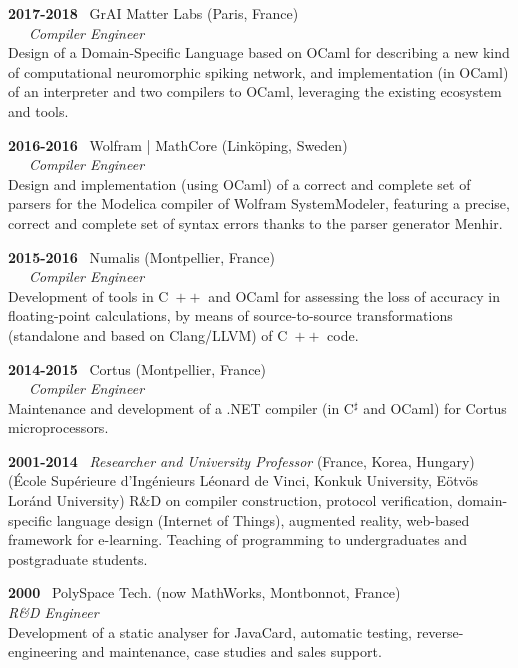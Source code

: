 \documentclass[a4paper,11pt]{article}
\newcommand{\cpp}{\mbox{C \hspace*{-2.5mm} \raise 0.7mm \hbox{${\scriptscriptstyle ++}$}}}
\begin{document}
\bigskip

\noindent\textbf{2017-2018} \ \textsf{GrAI Matter Labs} (Paris,
France)\\ \ \ \ \emph{Compiler Engineer}\\ Design of a Domain-Specific
Language based on OCaml for describing a new kind of computational
neuromorphic spiking network, and implementation (in OCaml) of an
interpreter and two compilers to OCaml, leveraging the existing
ecosystem and tools.

\bigskip

\noindent\textbf{2016-2016} \ \textsf{Wolfram | MathCore}
(Link\"oping, Sweden)\\ \ \ \ \emph{Compiler Engineer}\\ Design and
implementation (using OCaml) of a correct and complete set of parsers
for the Modelica compiler of Wolfram SystemModeler, featuring a
precise, correct and complete set of syntax errors thanks to the
parser generator Menhir.

\newpage

\noindent\textbf{2015-2016} \ \textsf{Numalis} (Montpellier,
France)\\ \ \ \ \emph{Compiler Engineer}\\ Development of tools in
\cpp{} and OCaml for assessing the loss of accuracy in floating-point
calculations, by means of source-to-source transformations (standalone
and based on Clang/LLVM) of \cpp{} code.

\bigskip

\noindent\textbf{2014-2015} \ \textsf{Cortus} (Montpellier,
France)\\ \ \ \ \emph{Compiler Engineer}\\ Maintenance and development
of a .NET compiler (in C$^\sharp$ and OCaml) for \textsf{Cortus}
microprocessors.

\bigskip

\noindent\textbf{2001-2014} \ \textsf{\emph{Researcher and University
    Professor}} (France, Korea, Hungary)\\ (\textsf{\'Ecole
  Sup\'erieure d'Ing\'enieurs L\'eonard de Vinci}, \textsf{Konkuk
  University}, \textsf{E\"otv\"os Lor\'and University}) R\&D on
compiler construction, protocol verification, domain-specific language
design (Internet of Things), augmented reality, web-based framework
for e-learning. Teaching of programming to undergraduates and
postgraduate students.

\bigskip

\noindent\textbf{2000} \ \textsf{PolySpace Tech.\@} (now MathWorks,
Montbonnot, France)\\ \emph{R\&D Engineer}\\ Development of a static
analyser for JavaCard, automatic testing, reverse\hyp{}engineering and
maintenance, case studies and sales support.
\end{document}
